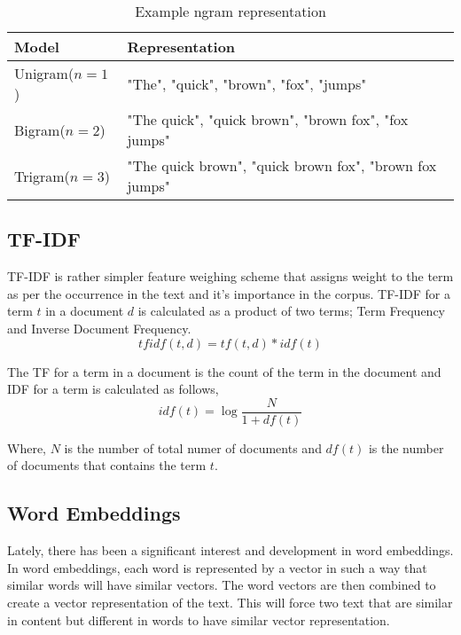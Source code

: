 \begin{table}[h]
\begin{center}
\caption{Example ngram representation}
\label{tbl:ngram_representation}
\begin{tabular}{p{3cm}p{8cm}}
\toprule 
Model&Representation\\
\midrule 
Unigram($n=1$)&"The", "quick", "brown", "fox", "jumps" \\
Bigram($n=2$)&"The quick", "quick brown", "brown fox", "fox jumps" \\
Trigram($n=3$)& "The quick brown", "quick brown fox", "brown fox jumps" \\
\bottomrule
\end{tabular}
\end{center}
\end{table}

\subsection{TF-IDF}
TF-IDF\cite{sparck1972statistical} is rather simpler feature weighing scheme that assigns weight to the term as per the occurrence in the text and it's importance in the corpus. TF-IDF for a term $t$ in a document $d$ is calculated as a product of two terms; Term Frequency and Inverse Document Frequency. 
\begin{equation}
    tfidf(t, d) = tf(t, d) * idf(t)
\end{equation}

The TF for a term in a document is the count of the term in the document and IDF for a term is calculated as follows,
\begin{equation}
    idf(t) = \log{\frac{N}{1 + df(t)}}
\end{equation}

Where, $N$ is the number of total numer of documents and $df(t)$ is the number of documents that contains the term $t$.

\subsection{Word Embeddings}
Lately, there has been a significant interest and development in word embeddings\cite{mikolov2013distributed}\cite{pennington2014glove}\cite{bojanowski2017enriching}. In word embeddings, each word is represented by a vector in such a way that similar words will have similar vectors\cite{goldberg2014word2vec}. The word vectors are then combined to create a vector representation of the text. This will force two text that are similar in content but different in words to have similar vector representation.

